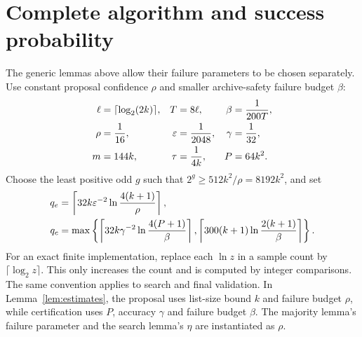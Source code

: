 \documentclass[11pt]{article}
\theoremstyle{remark}\newtheorem{remark}[theorem]{Remark}
\begin{document}
\section{Complete algorithm and success probability}
The generic lemmas above allow their failure parameters to be chosen separately. Use constant proposal confidence $\rho$ and smaller archive-safety failure budget $\beta$:
\begin{align}\label{eq:parameters}
 \ell&=\lceil\log_2(2k)\rceil,&T&=8\ell,&\beta&=\frac1{200T},\notag\\
 \rho&=\frac1{16},&\varepsilon&=\frac1{2048},&\gamma&=\frac1{32},\notag\\
 m&=144k,&\tau&=\frac1{4k},&P&=64k^2.
\end{align}
Choose the least positive odd $g$ such that $2^g\ge512k^2/\rho=8192k^2$, and set
\begin{align}\label{eq:batches}
 q_e&=\left\lceil32k\varepsilon^{-2}\ln\frac{4(k+1)}\rho\right\rceil,\notag\\
 q_c&=\max\left\{
 \left\lceil32k\gamma^{-2}\ln\frac{4(P+1)}\beta\right\rceil,
 \left\lceil300(k+1)\ln\frac{2(k+1)}\beta\right\rceil\right\}.
\end{align}
For an exact finite implementation, replace each $\ln z$ in a sample count by $\lceil\log_2 z\rceil$. This only increases the count and is computed by integer comparisons. The same convention applies to search and final validation. In Lemma~\ref{lem:estimates}, the proposal uses list-size bound $k$ and failure budget $\rho$, while certification uses $P$, accuracy $\gamma$ and failure budget $\beta$. The majority lemma's failure parameter and the search lemma's $\eta$ are instantiated as $\rho$.
\end{document}
